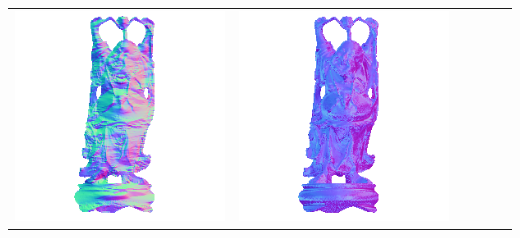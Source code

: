 \begin{tabularx}{\linewidth}{@{}Y@{}Y@{}Y@{}Y@{}Y@{}Y@{}}
\includegraphics[width=\linewidth]{semisynthetic/20150514_20_yu_out.png} &
\includegraphics[width=\linewidth]{semisynthetic/20150514_20_dpsn_out.png} &

\end{tabularx}

